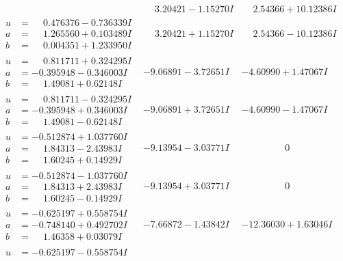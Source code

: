 \documentclass[1p]{elsarticle_modified}
\theoremstyle{definition}
\begin{document}
$$\begin{array}{c|c|c}
 & \phantom{-}3.20421 - 1.15270 I & \phantom{-}2.54366 + 10.12386 I \\ \hline\begin{aligned}
u &= \phantom{-}0.476376 - 0.736339 I \\
a &= \phantom{-}1.265560 + 0.103489 I \\
b &= \phantom{-}0.004351 + 1.233950 I\end{aligned}
 & \phantom{-}3.20421 + 1.15270 I & \phantom{-}2.54366 - 10.12386 I \\ \hline\begin{aligned}
u &= \phantom{-}0.811711 + 0.324295 I \\
a &= -0.395948 - 0.346003 I \\
b &= \phantom{-}1.49081 + 0.62148 I\end{aligned}
 & -9.06891 - 3.72651 I & -4.60990 + 1.47067 I \\ \hline\begin{aligned}
u &= \phantom{-}0.811711 - 0.324295 I \\
a &= -0.395948 + 0.346003 I \\
b &= \phantom{-}1.49081 - 0.62148 I\end{aligned}
 & -9.06891 + 3.72651 I & -4.60990 - 1.47067 I \\ \hline\begin{aligned}
u &= -0.512874 + 1.037760 I \\
a &= \phantom{-}1.84313 - 2.43983 I \\
b &= \phantom{-}1.60245 + 0.14929 I\end{aligned}
 & -9.13954 - 3.03771 I & \phantom{-0.000000 } 0 \\ \hline\begin{aligned}
u &= -0.512874 - 1.037760 I \\
a &= \phantom{-}1.84313 + 2.43983 I \\
b &= \phantom{-}1.60245 - 0.14929 I\end{aligned}
 & -9.13954 + 3.03771 I & \phantom{-0.000000 } 0 \\ \hline\begin{aligned}
u &= -0.625197 + 0.558754 I \\
a &= -0.748140 + 0.492702 I \\
b &= \phantom{-}1.46358 + 0.03079 I\end{aligned}
 & -7.66872 - 1.43842 I & -12.36030 + 1.63046 I \\ \hline\begin{aligned}
u &= -0.625197 - 0.558754 I \\

\end{aligned}
\end{array}$$
\end{document}
